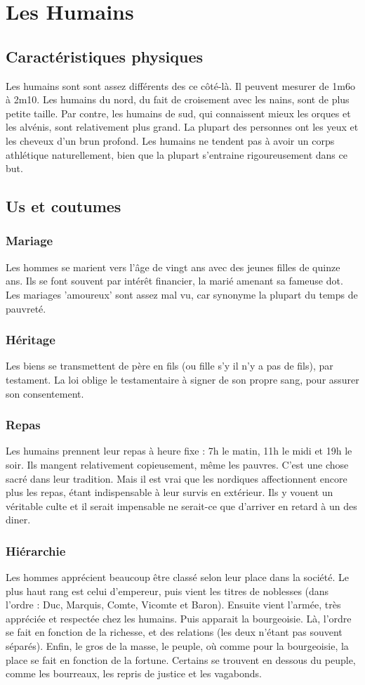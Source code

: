 \section{Les Humains}
\subsection{Caractéristiques physiques}
Les humains sont sont assez différents des ce côté-là. Il peuvent mesurer de 1m6o à 2m10. Les humains du nord, du fait de croisement avec les nains, sont de plus petite taille. Par contre, les humains de sud, qui connaissent mieux les orques et les alvénis, sont relativement plus grand. La plupart des personnes ont les yeux et les cheveux d’un brun profond. Les humains ne tendent pas à avoir un corps athlétique naturellement, bien que la plupart s’entraine rigoureusement dans ce but. 
\subsection{Us et coutumes}
\subsubsection{Mariage}
Les hommes se marient vers l’âge de vingt ans avec des jeunes filles de quinze ans. Ils se font souvent par intérêt financier, la marié amenant sa fameuse dot. Les mariages ’amoureux’ sont assez mal vu, car synonyme la plupart du temps de pauvreté. 
\subsubsection{Héritage}
Les biens se transmettent de père en fils (ou fille s’y il n’y a pas de fils), par testament. La loi oblige le testamentaire à signer de son propre sang, pour assurer son consentement. 
\subsubsection{Repas}
Les humains prennent leur repas à heure fixe : 7h le matin, 11h le midi et 19h le soir. Ils mangent relativement copieusement, même les pauvres. C’est une chose sacré dans leur tradition. Mais il est vrai que les nordiques affectionnent encore plus les repas, étant indispensable à leur survis en extérieur. Ils y vouent un véritable culte et il serait impensable ne serait-ce que d'arriver en retard à un des diner. 
\subsubsection{Hiérarchie}
Les hommes apprécient beaucoup être classé selon leur place dans la société. Le plus haut rang est celui d’empereur, puis vient les titres de noblesses (dans l’ordre : Duc, Marquis, Comte, Vicomte et Baron). Ensuite vient l’armée, très appréciée et respectée chez les humains. Puis apparait la bourgeoisie. Là, l’ordre se fait en fonction de la richesse, et des relations (les deux n’étant pas souvent séparés). Enfin, le gros de la masse, le peuple, où comme pour la bourgeoisie, la place se fait en fonction de la fortune. Certains se trouvent en dessous du peuple, comme les bourreaux, les repris de justice et les vagabonds. 
